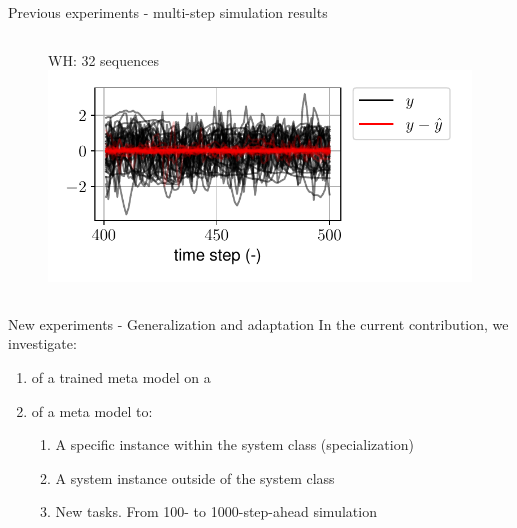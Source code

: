 \documentclass{beamer}
\begin{document}
\begin{frame}{Previous experiments - multi-step simulation results}
\begin{columns}[t]
\begin{center}
\begin{figure}
WH: 32 sequences
\includegraphics[width=\textwidth]{fig/wh_sim_batch.pdf}
\end{figure}
\end{center}
\end{columns}
\end{frame}

\begin{frame}{New experiments - Generalization and adaptation}
     In the current contribution, we investigate:
     \begin{enumerate}
          \item {} of a trained meta model on a 
          \item {} of a meta model to:
          \begin{enumerate}
               \item A {specific instance} within the system class (specialization)
               \item A {system instance} outside of the system class
               \item New tasks. From 100- to 1000-step-ahead simulation
          \end{enumerate}

     \end{enumerate}
\end{frame}
\end{document}
